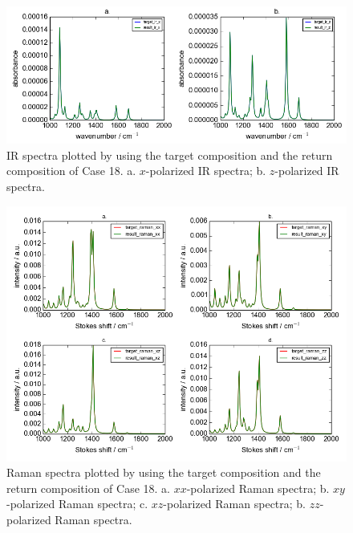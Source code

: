 \begin{figure}[!ht] 
\centering
\includegraphics[scale=0.5]{Figures/chapter4_result_target_plotting_500datapoint_ir_version2.png}
\caption{IR spectra plotted by using the target composition and the return composition of Case 18. a. $x$-polarized IR spectra; b. $z$-polarized IR spectra.} \label{fig:4.5}
\end{figure}

\begin{figure}[!ht] 
\centering
\includegraphics[scale=0.7]{Figures/chapter4_result_target_plotting_500datapoint_raman_version2.png}
\caption{Raman spectra plotted by using the target composition and the return composition of Case 18. a. $xx$-polarized Raman spectra; b. $xy$-polarized Raman spectra; c. $xz$-polarized Raman spectra; b. $zz$-polarized Raman spectra.} \label{fig:4.6}
\end{figure}

